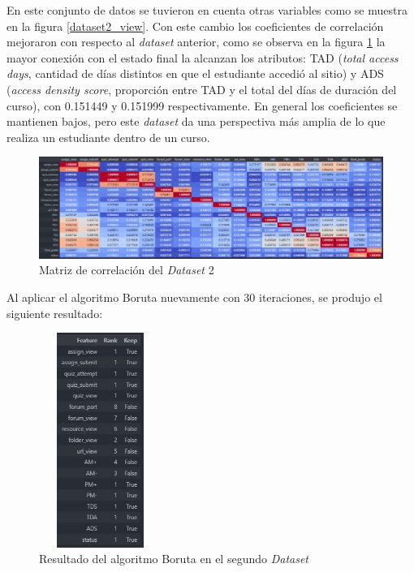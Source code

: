 En este conjunto de datos se tuvieron en cuenta otras variables como se muestra en la figura \ref{dataset2_view}. Con este cambio los coeficientes de correlación mejoraron con respecto al \textit{dataset} anterior, como se observa en la 
figura \ref{dataset2_corr} la mayor conexión con el estado final la alcanzan los atributos: TAD (\textit{total access days}, cantidad de días distintos en que el estudiante accedió al sitio) y 
ADS (\textit{access density score}, proporción entre TAD y el total del días de duración del curso), con 0.151449 y 0.151999 respectivamente. 
En general los coeficientes se mantienen bajos, pero este \textit{dataset} da una perspectiva más amplia de lo que realiza un estudiante dentro de un curso.


\newpage
\begin{figure}[htb]
    \centering
    \includegraphics[width = 1 \textwidth]{Graphics/corr_dataset2.jpg}
    \caption{Matriz de correlación del \textit{Dataset} 2}
    \label{dataset2_corr}
\end{figure}   


Al aplicar el algoritmo Boruta nuevamente con 30 iteraciones, se produjo el siguiente resultado: 


\begin{figure}[htb]
    \centering
    \includegraphics[height=7cm, width=4cm]{Graphics/boruta_dataset2.jpg}
    \caption{Resultado del algoritmo Boruta en el segundo \textit{Dataset}}
    \label{boruta2}
\end{figure} 

